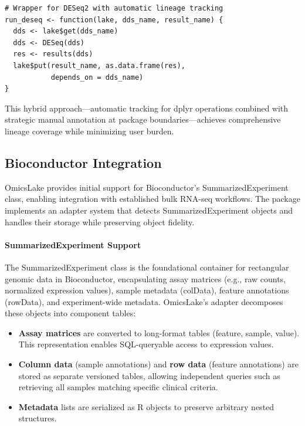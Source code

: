 \documentclass[11pt,a4paper]{article}
\begin{document}
\begin{lstlisting}[caption={Wrapper function for automatic lineage at Bioconductor boundaries}]
# Wrapper for DESeq2 with automatic lineage tracking
run_deseq <- function(lake, dds_name, result_name) {
  dds <- lake$get(dds_name)
  dds <- DESeq(dds)
  res <- results(dds)
  lake$put(result_name, as.data.frame(res),
           depends_on = dds_name)
}
\end{lstlisting}

This hybrid approach---automatic tracking for dplyr operations combined with strategic manual annotation at package boundaries---achieves comprehensive lineage coverage while minimizing user burden.

\subsection{Bioconductor Integration}

OmicsLake provides initial support for Bioconductor's SummarizedExperiment class, enabling integration with established bulk RNA-seq workflows. The package implements an adapter system that detects SummarizedExperiment objects and handles their storage while preserving object fidelity.

\paragraph{SummarizedExperiment Support}
The SummarizedExperiment class \citep{morgan2009summarizedexperiment} is the foundational container for rectangular genomic data in Bioconductor, encapsulating assay matrices (e.g., raw counts, normalized expression values), sample metadata (colData), feature annotations (rowData), and experiment-wide metadata. OmicsLake's adapter decomposes these objects into component tables:

\begin{itemize}
    \item \textbf{Assay matrices} are converted to long-format tables (feature, sample, value). This representation enables SQL-queryable access to expression values.
    \item \textbf{Column data} (sample annotations) and \textbf{row data} (feature annotations) are stored as separate versioned tables, allowing independent queries such as retrieving all samples matching specific clinical criteria.
    \item \textbf{Metadata} lists are serialized as R objects to preserve arbitrary nested structures.
\end{itemize}
\end{document}
